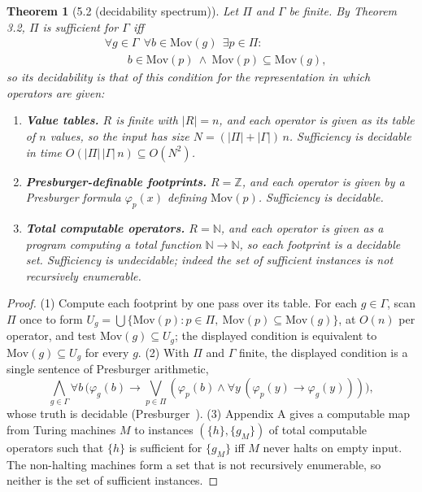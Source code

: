 \documentclass[conference]{IEEEtran}
\newcommand{\Mov}{\mathrm{Mov}}
\theoremstyle{run}
\newtheorem*{theorem}{Theorem}
\begin{document}
\begin{theorem}[5.2 (decidability spectrum)]
Let $\Pi$ and $\Gamma$ be finite. By Theorem 3.2, $\Pi$ is sufficient for $\Gamma$ iff \[\begin{aligned} &\forall g \in \Gamma\ \ \forall b \in \Mov(g)\ \ \exists p \in \Pi:\\ &\qquad b \in \Mov(p)\ \wedge\ \Mov(p) \subseteq \Mov(g), \end{aligned}\] so its decidability is that of this condition for the representation in which operators are given:
\begin{enumerate}
\item \textbf{Value tables.} $R$ is finite with $|R| = n$, and each operator is given as its table of $n$ values, so the input has size $N = (|\Pi| + |\Gamma|)\,n$. Sufficiency is decidable in time $O(|\Pi|\,|\Gamma|\,n) \subseteq O(N^2)$.
\item \textbf{Presburger-definable footprints.} $R = \mathbb{Z}$, and each operator is given by a Presburger formula $\varphi_p(x)$ defining $\Mov(p)$. Sufficiency is decidable.
\item \textbf{Total computable operators.} $R = \mathbb{N}$, and each operator is given as a program computing a total function $\mathbb{N} \to \mathbb{N}$, so each footprint is a decidable set. Sufficiency is undecidable; indeed the set of sufficient instances is not recursively enumerable.
\end{enumerate}
\end{theorem}

\begin{proof}
(1) Compute each footprint by one pass over its table. For each $g \in \Gamma$, scan $\Pi$ once to form $U_g = \bigcup\{\Mov(p) : p \in \Pi,\ \Mov(p) \subseteq \Mov(g)\}$, at $O(n)$ per operator, and test $\Mov(g) \subseteq U_g$; the displayed condition is equivalent to $\Mov(g) \subseteq U_g$ for every $g$. (2) With $\Pi$ and $\Gamma$ finite, the displayed condition is a single sentence of Presburger arithmetic, \[ \textstyle\bigwedge_{g \in \Gamma} \forall b\, \big(\varphi_g(b) \to \bigvee_{p \in \Pi} (\varphi_p(b) \wedge \forall y\, (\varphi_p(y) \to \varphi_g(y)))\big), \] whose truth is decidable (Presburger~\cite{presburger1929}). (3) Appendix A gives a computable map from Turing machines $M$ to instances $(\{h\}, \{g_M\})$ of total computable operators such that $\{h\}$ is sufficient for $\{g_M\}$ iff $M$ never halts on empty input. The non-halting machines form a set that is not recursively enumerable, so neither is the set of sufficient instances.
\end{proof}
\end{document}
